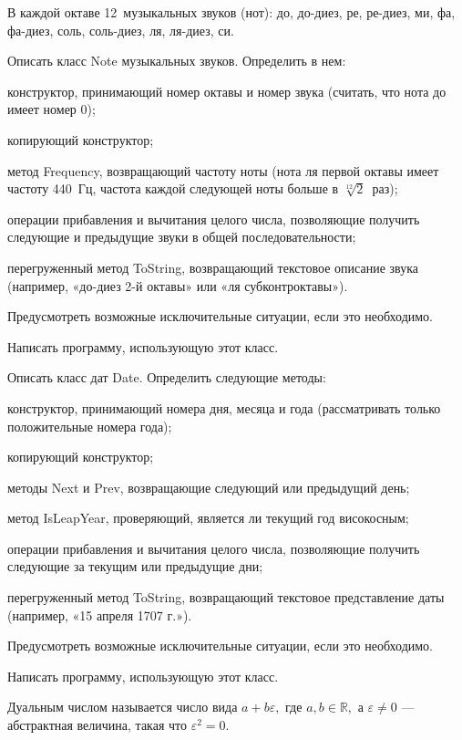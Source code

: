 В каждой октаве 12~музыкальных звуков (нот): до, до-диез, ре, ре-диез,
ми, фа, фа-диез, соль, соль-диез, ля, ля-диез, си.

Описать класс Note музыкальных звуков. Определить в нем:
\begin{itemize*}
\item конструктор, принимающий номер октавы и номер звука (считать,
  что нота до имеет номер $0$);
\item копирующий конструктор;
\item метод Frequency, возвращающий частоту ноты (нота ля первой
  октавы имеет частоту 440~Гц, частота каждой следующей ноты больше в
  $\sqrt[12]{2}$~раз);
\item операции прибавления и вычитания целого числа, позволяющие
  получить следующие и предыдущие звуки в общей последовательности;
\item перегруженный метод ToString, возвращающий текстовое описание
  звука (например, «до-диез 2-й октавы» или «ля субконтроктавы»).
\end{itemize*}

Предусмотреть возможные исключительные ситуации, если это необходимо.

Написать программу, использующую этот класс.

\task Описать класс дат Date. Определить следующие методы:
\begin{itemize*}
\item конструктор, принимающий номера дня, месяца и года
  (рассматривать только положительные номера года);
\item копирующий конструктор;
\item методы Next и Prev, возвращающие следующий или предыдущий день;
\item метод IsLeapYear, проверяющий, является ли текущий год
  високосным;
\item операции прибавления и вычитания целого числа, позволяющие
  получить следующие за текущим или предыдущие дни;
\item перегруженный метод ToString, возвращающий текстовое
  представление даты (например, «15 апреля 1707 г.»).
\end{itemize*}

Предусмотреть возможные исключительные ситуации, если это необходимо.

Написать программу, использующую этот класс.

\task Дуальным числом называется число вида $a+b\varepsilon,$ где $a,
b \in \mathbb{R},$ а $\varepsilon \neq 0$ — абстрактная величина,
такая что $\varepsilon^2 = 0$.

